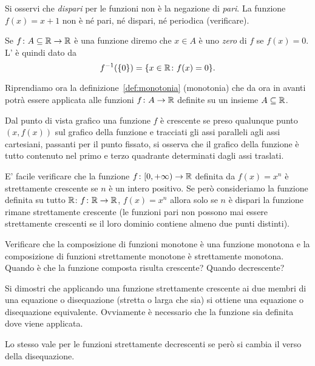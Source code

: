 Si osservi che \emph{dispari} per le funzioni non è la negazione
di \emph{pari}.
La funzione $f(x) = x+1$ non è né pari, né dispari, né periodica
(verificare).

\begin{definition}[zeri]
  Se $f\colon A\subseteq \mathbb R \to \mathbb R$ è una funzione diremo che
  $x\in A$ è uno \emph{zero} di $f$ se $f(x)=0$.
  L'
  è quindi dato da
  \[
    f^{-1}({\left\{ 0 \right\}}) = {\left\{ x\in \mathbb R\colon f(x) = 0 \right\}}.
  \]
\end{definition}

Riprendiamo ora la definizione~\ref{def:monotonia} (monotonia) che da ora in avanti 
potrà essere applicata alle funzioni $f\colon A \to \mathbb R$ definite 
su un insieme $A\subseteq \mathbb R$.

Dal punto di vista grafico una funzione $f$ è crescente
se preso qualunque punto $(x,f(x))$ sul grafico della funzione
e tracciati gli assi paralleli agli assi cartesiani, passanti
per il punto fissato, si osserva che il grafico della funzione
è tutto contenuto nel primo e terzo quadrante determinati
dagli assi traslati.

E' facile verificare che la funzione $f\colon [0,+\infty)\to \mathbb R$
definita da $f(x)=x^n$
è strettamente crescente se $n$ è un intero positivo.
Se però consideriamo la funzione definita su tutto
$\mathbb R$: $f\colon \mathbb R \to \mathbb R$,
$f(x)=x^n$ allora solo se $n$ è dispari la funzione rimane
strettamente crescente
(le funzioni pari non possono mai essere strettamente crescenti se
il loro dominio contiene almeno due punti distinti).

\begin{exercise}
Verificare che la composizione di funzioni monotone è una
funzione monotona e la composizione di funzioni strettamente
monotone è strettamente monotona.
Quando è che la funzione composta risulta crescente?
Quando decrescente?
\end{exercise}

\begin{exercise}
Si dimostri che applicando una funzione strettamente crescente ai due
membri di una equazione o disequazione (stretta o larga che sia)
si ottiene una equazione o disequazione equivalente.
Ovviamente è necessario che la funzione sia definita dove viene applicata.

Lo stesso vale per le funzioni strettamente decrescenti se però si cambia il verso della disequazione.
\end{exercise}

